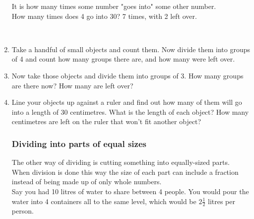 \documentclass{article}
\begin{document}
\begin{enumerate}
It is how many times some number "goes into" some other number.\\

How many times does 4 go into 30? 7 times, with 2 left over.\\

\\


\item Take a handful of small objects and count them. Now divide them into groups of 4 and count how many groups there are, and how many were left over.

\item Now take those objects and divide them into groups of 3. How many groups are there now? How many are left over?

\item Line your objects up against a ruler and find out how many of them will go into a length of 30 centimetres. What is the length of each object? How many centimetres are left on the ruler that won't fit another object?

\subsubsection*{Dividing into parts of equal sizes}

The other way of dividing is cutting something into equally-sized parts.\\

When division is done this way the size of each part can include a fraction instead of being made up of only whole numbers.\\

Say you had 10 litres of water to share between 4 people. You would pour the water into 4 containers all to the same level, which would be $2\frac{1}{2}$ litres per person.\\


\end{enumerate}
\end{document}
